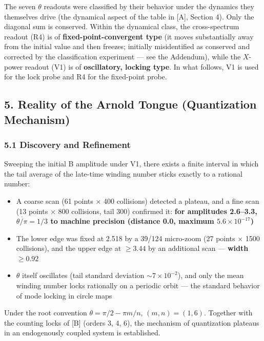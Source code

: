 \documentclass[
  a4paper,
]{article}
\providecommand{\tightlist}{%
  \setlength{\itemsep}{0pt}\setlength{\parskip}{0pt}}
\begin{document}
The seven \(\theta\) readouts were classified by their behavior under
the dynamics they themselves drive (the dynamical aspect of the table in
{[}A{]}, Section 4). Only the diagonal sum is conserved. Within the
dynamical class, the cross-spectrum readout (R4) is of
\textbf{fixed-point-convergent type} (it moves substantially away from
the initial value and then freezes; initially misidentified as conserved
and corrected by the classification experiment --- see the Addendum),
while the \(X\)-power readout (V1) is of \textbf{oscillatory, locking
type}. In what follows, V1 is used for the lock probe and R4 for the
fixed-point probe.

\subsection{5. Reality of the Arnold Tongue (Quantization
Mechanism)}\label{reality-of-the-arnold-tongue-quantization-mechanism}

\subsubsection{5.1 Discovery and
Refinement}\label{discovery-and-refinement}

Sweeping the initial B amplitude under V1, there exists a finite
interval in which the tail average of the late-time winding number
sticks exactly to a rational number:

\begin{itemize}
\tightlist
\item
  A coarse scan (61 points × 400 collisions) detected a plateau, and a
  fine scan (13 points × 800 collisions, tail 300) confirmed it:
  \textbf{for amplitudes 2.6--3.3, \(\overline{\theta/\pi}=1/3\) to
  machine precision (distance 0.0, maximum \(5.6\times10^{-17}\))}
\item
  The lower edge was fixed at 2.518 by a 39/124 micro-zoom (27 points ×
  1500 collisions), and the upper edge at \(\ge3.44\) by an additional
  scan --- \textbf{width \(\ge0.92\)}
\item
  \(\theta\) itself oscillates (tail standard deviation
  \(\sim7\times10^{-2}\)), and only the mean winding number locks
  rationally on a periodic orbit --- the standard behavior of mode
  locking in circle maps
\end{itemize}

Under the root convention \(\theta=\pi/2-\pi m/n\), \((m,n)=(1,6)\).
Together with the counting locks of {[}B{]} (orders 3, 4, 6), the
mechanism of quantization plateaus in an endogenously coupled system is
established.
\end{document}
